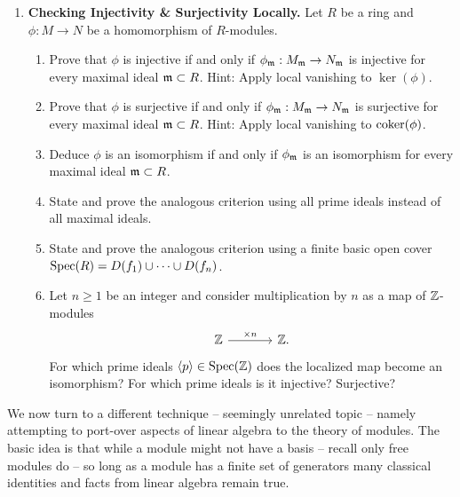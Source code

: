 \documentclass[Notebook.tex]{subfiles}
\begin{document}
\begin{enumerate}[leftmargin=*, series=problems]
\item \textbf{Checking Injectivity \& Surjectivity Locally.} Let $R$ be a ring and $\phi:M\to N$ be a homomorphism of $R$-modules. 
\begin{enumerate}
    \item Prove that $\phi$ is injective if and only if $\phi_{\operatorname{\mathfrak{m}}}:M_{\operatorname{\mathfrak{m}}}\to N_{\operatorname{\mathfrak{m}}}$ is injective for every maximal ideal $\operatorname{\mathfrak{m}}\subset R$. Hint: Apply local vanishing to $\ker(\phi)$.
    \item Prove that $\phi$ is surjective if and only if $\phi_{\operatorname{\mathfrak{m}}}:M_{\operatorname{\mathfrak{m}}}\to N_{\operatorname{\mathfrak{m}}}$ is surjective for every maximal ideal $\operatorname{\mathfrak{m}}\subset R$. Hint: Apply local vanishing to $\operatorname{coker}(\phi)$.
    \item Deduce $\phi$ is an isomorphism if and only if $\phi_{\operatorname{\mathfrak{m}}}$ is an isomorphism for every maximal ideal $\operatorname{\mathfrak{m}}\subset R$.
    \item State and prove the analogous criterion using all prime ideals instead of all maximal ideals.
    \item State and prove the analogous criterion using a finite basic open cover $\operatorname{Spec}(R)=D(f_1)\cup\cdots\cup D(f_n)$.
    \item Let $n\geq 1$ be an integer and consider multiplication by $n$ as a map of $\mathbb Z$-modules
    \[
    \begin{tikzcd}[column sep=large]
    \Z \arrow[r, "\times n"] & \Z.
    \end{tikzcd}
    \]
    For which prime ideals $\langle p\rangle\in \operatorname{Spec}(\mathbb Z)$ does the localized map become an isomorphism? For which prime ideals is it injective? Surjective?
\end{enumerate}
\end{enumerate}

\hrulefill

We now turn to a different technique -- seemingly unrelated topic -- namely attempting to port-over aspects of linear algebra to the theory of modules. The basic idea is that while a module might not have a basis -- recall only free modules do -- so long as a module has a finite set of generators many classical identities and facts from linear algebra remain true. 
\end{document}
